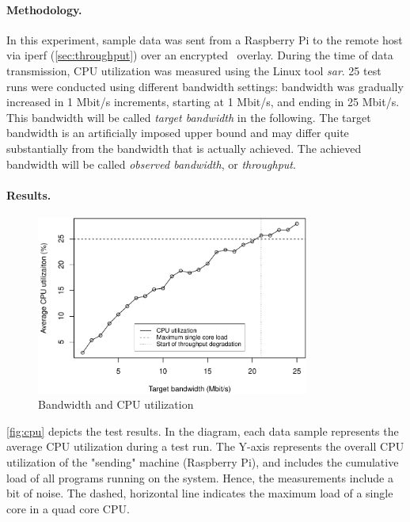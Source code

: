 \paragraph{Methodology.} In this experiment, sample data was sent from a Raspberry Pi to the remote host via iperf (\cf \autoref{sec:throughput}) over an encrypted \wnet\ overlay. During the time of data transmission, CPU utilization was measured using the Linux tool \emph{sar}. 25 test runs were conducted using different bandwidth settings: bandwidth was gradually increased in 1 Mbit/s increments, starting at 1 Mbit/s, and ending in 25 Mbit/s. This bandwidth will be called \emph{target bandwidth} in the following. The target bandwidth is an artificially imposed upper bound and may differ quite substantially from the bandwidth that is actually achieved. The achieved bandwidth will be called \emph{observed bandwidth}, or \emph{throughput}.

\paragraph{Results.} 

\begin{figure}[htpb]
  \centering
  \includegraphics[width=0.8\textwidth]{figures/cpu}
  \caption[Weave CPU utilization test results]{Bandwidth and CPU utilization}\label{fig:cpu}
\end{figure}

\autoref{fig:cpu} depicts the test results. In the diagram, each data sample represents the average CPU utilization during a test run. The Y-axis represents the overall CPU utilization of the "sending" machine (Raspberry Pi), and includes the cumulative load of all programs running on the system. Hence, the measurements include a bit of noise. The dashed, horizontal line indicates the maximum load of a single core in a quad core CPU.

